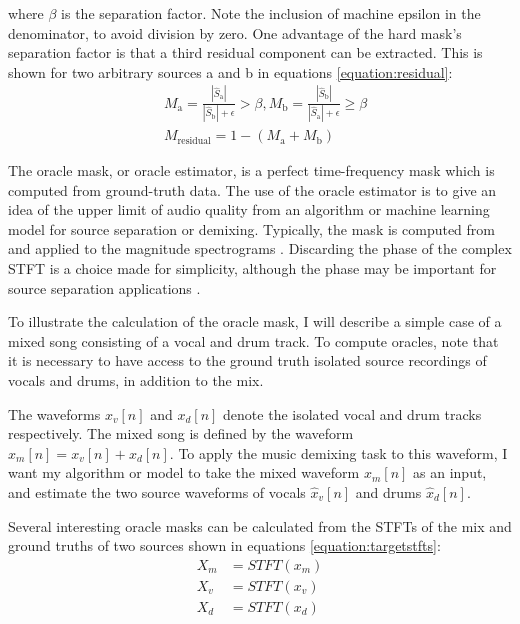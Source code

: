 \documentclass[report.tex]{subfiles}
\begin{document}
where $\beta$ is the separation factor. Note the inclusion of machine epsilon in the denominator, to avoid division by zero. One advantage of the hard mask's separation factor is that a third residual component can be extracted. This is shown for two arbitrary sources a and b in equations \eqref{equation:residual}:
\begin{align}\tag{23}\label{equation:residual}
	\nonumber & M_{\text{a}} = \frac{|\hat{S}_{\text{a}}|}{|\hat{S}_{\text{b}}| + \epsilon} > \beta, M_{\text{b}} = \frac{|\hat{S}_{\text{b}}|}{|\hat{S}_{\text{a}}| + \epsilon} \ge \beta\\
	\nonumber & M_{\text{residual}} = 1 - (M_{\text{a}} + M_{\text{b}})
\end{align}

The oracle mask, or oracle estimator, is a perfect time-frequency mask which is computed from ground-truth data. The use of the oracle estimator is to give an idea of the upper limit of audio quality from an algorithm or machine learning model for source separation or demixing. Typically, the mask is computed from and applied to the magnitude spectrograms \parencite{fitzgerald1, fitzgerald2, driedger, umx, plumbley1, plumbley2}. Discarding the phase of the complex STFT is a choice made for simplicity, although the phase may be important for source separation applications \parencite{ditchphase}.

To illustrate the calculation of the oracle mask, I will describe a simple case of a mixed song consisting of a vocal and drum track. To compute oracles, note that it is necessary to have access to the ground truth isolated source recordings of vocals and drums, in addition to the mix.

The waveforms $x_{v}[n]$ and $x_{d}[n]$ denote the isolated vocal and drum tracks respectively. The mixed song is defined by the waveform $x_{m}[n] = x_{v}[n] + x_{d}[n]$. To apply the music demixing task to this waveform, I want my algorithm or model to take the mixed waveform $x_{m}[n]$ as an input, and estimate the two source waveforms of vocals $\hat{x}_{v}[n]$ and drums $\hat{x}_{d}[n]$.

Several interesting oracle masks can be calculated from the STFTs of the mix and ground truths of two sources shown in equations \eqref{equation:targetstfts}:
\begin{align}\tag{24}\label{equation:targetstfts}
	\nonumber X_{m} &= \mathit{STFT}(x_{m})\\
	\nonumber X_{v} &= \mathit{STFT}(x_{v})\\
	\nonumber X_{d} &= \mathit{STFT}(x_{d})
\end{align}
 
\end{document}
